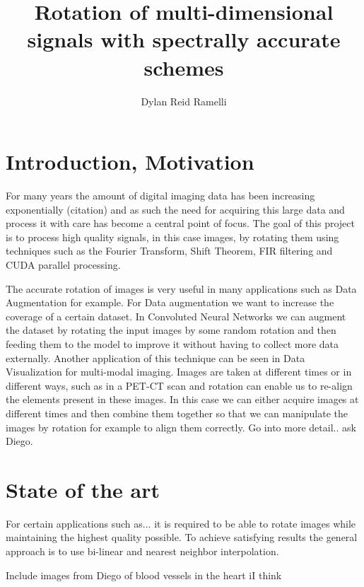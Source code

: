 \documentclass[]{usiinfbachelorproject}
\title{Rotation of multi-dimensional signals with spectrally accurate schemes}
\author{Dylan Reid Ramelli}
\begin{document}
	
	\maketitle
		
		
	\tableofcontents
	\newpage
	\section{Introduction, Motivation}\label{introduction}
	
	For many years the amount of digital imaging data has been increasing exponentially (citation) and as such the need for acquiring this large data and process it with care has become a central point of focus. The goal of this project is to process high quality signals, in this case images, by rotating them using techniques such as the Fourier Transform, Shift Theorem, FIR filtering and CUDA parallel processing.
	
	
	
	
	
	
	The accurate rotation of images is very useful in many applications such as Data Augmentation for example. For Data augmentation we want to increase the coverage of a certain dataset. In Convoluted Neural Networks we can augment the dataset by rotating the input images by some random rotation and then feeding them to the model to improve it without having to collect more data externally.
	Another application of this technique can be seen in Data Visualization for multi-modal imaging. Images are taken at different times or in different ways, such as in a PET-CT scan and rotation can enable us to re-align the elements present in these images. In this case we can either acquire images at different times and then combine them together so that we can manipulate the images by rotation for example to align them correctly. Go into more detail.. ask Diego.
	
	
	
	

	
	\section{State of the art}
	For certain applications such as... it is required to be able to rotate images while maintaining the highest quality possible. To achieve satisfying results the general approach is to use bi-linear and nearest neighbor interpolation.
	
	
	Include images from Diego of blood vessels in the heart iI think
	
\end{document}
